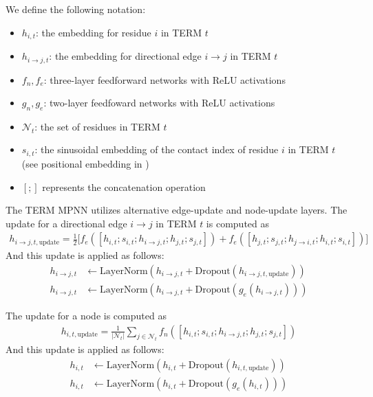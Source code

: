 \documentclass{article}
\begin{document}
We define the following notation:
\begin{itemize}
    \item $h_{i,t}$: the embedding for residue $i$ in TERM $t$
    \item $h_{i \rightarrow j, t}$: the embedding for directional edge $i \rightarrow j$ in TERM $t$
    \item $f_n, f_e$: three-layer feedforward networks with ReLU activations
    \item $g_n, g_e$: two-layer feedfoward networks with ReLU activations
    \item $\mathcal{N}_t$: the set of residues in TERM $t$
    \item $s_{i,t}$: the sinusoidal embedding of the contact index of residue $i$ in TERM $t$ (see positional embedding in \citet{Vaswani2017})
    \item $[;]$ represents the concatenation operation
\end{itemize}

The TERM MPNN utilizes alternative edge-update and node-update layers. The update for a directional edge $i \rightarrow j$ in TERM $t$ is computed as
\begin{align*}
    h_{i \rightarrow j,t,\text{update}} = \frac{1}{2} \Big[ f_e([h_{i,t}; s_{i,t}; h_{i\rightarrow j, t}; h_{j,t}; s_{j,t}]) + f_e([h_{j,t}; s_{j,t}; h_{j\rightarrow i, t}; h_{i,t}; s_{i,t}]) \Big]
\end{align*}
And this update is applied as follows:
\begin{align*}
    h_{i\rightarrow j, t} &\leftarrow \text{LayerNorm}(h_{i \rightarrow j,t} + \text{Dropout}(h_{i \rightarrow j,t,\text{update}}))\\
    h_{i\rightarrow j, t} &\leftarrow \text{LayerNorm}(h_{i \rightarrow j,t} + \text{Dropout}(g_e(h_{i \rightarrow j,t})))
\end{align*}

The update for a node is computed as
\begin{align*}
    h_{i,t,\text{update}} = \frac{1}{\left| \mathcal{N}_t \right|} \sum_{j \in \mathcal{N}_t} f_n([h_{i,t}; s_{i,t}; h_{i\rightarrow j, t}; h_{j,t}; s_{j,t}])
\end{align*}
And this update is applied as follows:
\begin{align*}
    h_{i, t} &\leftarrow \text{LayerNorm}(h_{i,t} + \text{Dropout}(h_{i,t,\text{update}}))\\
    h_{i, t} &\leftarrow \text{LayerNorm}(h_{i,t} + \text{Dropout}(g_e(h_{i,t})))
\end{align*}
\end{document}
